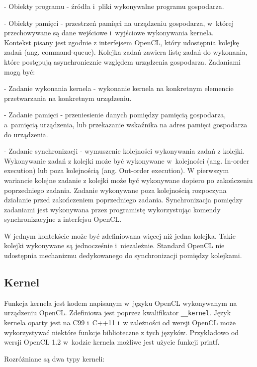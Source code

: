 - Obiekty programu - źródła i~pliki wykonywalne programu gospodarza.

- Obiekty pamięci - przestrzeń pamięci na urządzeniu gospodarza, w~której przechowywane są dane wejściowe i~wyjściowe wykonywania kernela.\\

Kontekst pisany jest zgodnie z interfejsem OpenCL, który udostępnia kolejkę zadań (ang. command-queue). Kolejka zadań zawiera listę zadań do wykonania, które postępują asynchronicznie względem urządzenia gospodarza. Zadaniami mogą być:

- Zadanie wykonania kernela - wykonanie kernela na konkretnym elemencie przetwarzania na konkretnym urządzeniu.

- Zadanie pamięci - przeniesienie danych pomiędzy pamięcią gospodarza, a~pamięcią urządzenia, lub przekazanie wskaźnika na adres pamięci gospodarza do urządzenia.

- Zadanie synchronizacji - wymuszenie kolejności wykonywania zadań z kolejki.\\

Wykonywanie zadań z kolejki może być wykonywane w~kolejności (ang. In-order execution) lub poza kolejnością (ang. Out-order execution). W pierwszym wariancie kolejne zadanie z kolejki może być wykonywane dopiero po zakończeniu poprzedniego zadania. Zadanie wykonywane poza kolejnością rozpoczyna działanie przed zakończeniem poprzedniego zadania. Synchronizacja pomiędzy zadaniami jest wykonywana przez programistę wykorzystując komendy synchronizacyjne z interfejsu OpenCL.

W jednym kontekście może być zdefiniowana więcej niż jedna kolejka. Takie kolejki wykonywane są jednocześnie i~niezależnie. Standard OpenCL nie udostępnia mechanizmu dedykowanego do synchronizacji pomiędzy kolejkami.


\subsection{Kernel}\label{sec:OpenC4L}

Funkcja kernela jest kodem napisanym w~języku OpenCL wykonywanym na urządzeniu OpenCL. Zdefiniowa jest poprzez kwalifikator \verb|__kernel|. Język kernela oparty jest na C99 i~C++11 i~w zależności od wersji OpenCL może wykorzystywać niektóre funkcje biblioteczne z tych języków. Przykładowo od wersji OpenCL 1.2 w~kodzie kernela możliwe jest użycie funkcji printf.

Rozróżniane są dwa typy kerneli:

